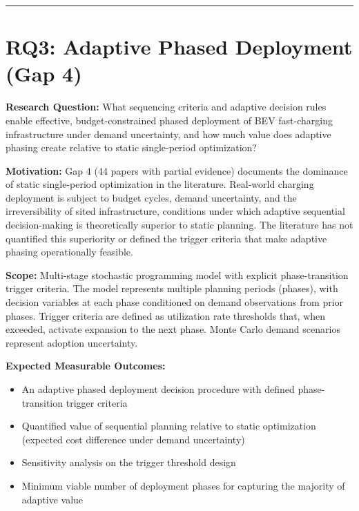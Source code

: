 \documentclass[letterpaper, 12pt, oneside, doublespacing]{Thesis}
\begin{document}
\bigskip\noindent\rule{\linewidth}{0.4pt}\bigskip


\section{RQ3: Adaptive Phased Deployment (Gap 4)}


\noindent \textbf{Research Question:} What sequencing criteria and adaptive decision rules enable effective, budget-constrained phased deployment of BEV fast-charging infrastructure under demand uncertainty, and how much value does adaptive phasing create relative to static single-period optimization?



\noindent \textbf{Motivation:} Gap 4 (44 papers with partial evidence) documents the dominance of static single-period optimization in the literature. Real-world charging deployment is subject to budget cycles, demand uncertainty, and the irreversibility of sited infrastructure, conditions under which adaptive sequential decision-making is theoretically superior to static planning. The literature has not quantified this superiority or defined the trigger criteria that make adaptive phasing operationally feasible.



\noindent \textbf{Scope:} Multi-stage stochastic programming model with explicit phase-transition trigger criteria. The model represents multiple planning periods (phases), with decision variables at each phase conditioned on demand observations from prior phases. Trigger criteria are defined as utilization rate thresholds that, when exceeded, activate expansion to the next phase. Monte Carlo demand scenarios represent adoption uncertainty.



\noindent \textbf{Expected Measurable Outcomes:}

\begin{itemize}
  \item An adaptive phased deployment decision procedure with defined phase-transition trigger criteria
  \item Quantified value of sequential planning relative to static optimization (expected cost difference under demand uncertainty)
  \item Sensitivity analysis on the trigger threshold design
  \item Minimum viable number of deployment phases for capturing the majority of adaptive value
\end{itemize}
\end{document}
